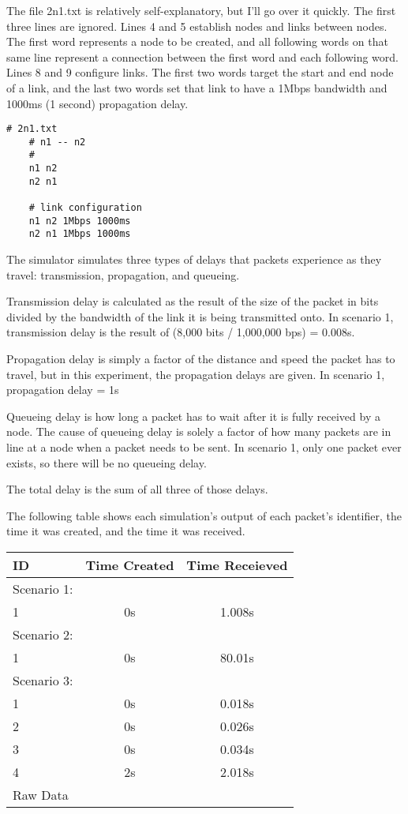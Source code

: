 \documentclass[11pt]{article}
\begin{document}
The file 2n1.txt is relatively self-explanatory, but I'll go over it quickly. The first three lines are ignored. Lines 4 and 5 establish nodes and links between nodes. The first word represents a node to be created, and all following words on that same line represent a connection between the first word and each following word. Lines 8 and 9 configure links. The first two words target the start and end node of a link, and the last two words set that link to have a 1Mbps bandwidth and 1000ms (1 second) propagation delay.

\begin{lstlisting}
# 2n1.txt
    # n1 -- n2
    #
    n1 n2
    n2 n1

    # link configuration
    n1 n2 1Mbps 1000ms
    n2 n1 1Mbps 1000ms
\end{lstlisting}

The simulator simulates three types of delays that packets experience as they travel: transmission, propagation, and queueing. 

Transmission delay is calculated as the result of the size of the packet in bits divided by the bandwidth of the link it is being transmitted onto. In scenario 1, transmission delay is the result of (8,000 bits / 1,000,000 bps) = 0.008s.

Propagation delay is simply a factor of the distance and speed the packet has to travel, but in this experiment, the propagation delays are given. In scenario 1, propagation delay = 1s

Queueing delay is how long a packet has to wait after it is fully received by a node. The cause of queueing delay is solely a factor of how many packets are in line at a node when a packet needs to be sent. In scenario 1, only one packet ever exists, so there will be no queueing delay.

The total delay is the sum of all three of those delays.

The following table shows each simulation's output of each packet's identifier, the time it was created, and the time it was received.

\vspace{0.5cm}
\begin{tabular}{lcc}
  \toprule
  ID & Time Created & Time Receieved\\
  \midrule
  Scenario 1: & & \\
  1 & 0s & 1.008s \\
  Scenario 2: & & \\
  1 & 0s & 80.01s \\
  Scenario 3: & & \\
  1 & 0s & 0.018s \\
  2 & 0s & 0.026s \\
  3 & 0s & 0.034s \\
  4 & 2s & 2.018s \\
  \bottomrule
  Raw Data
\end{tabular}
\vspace{0.5cm}
\end{document}
